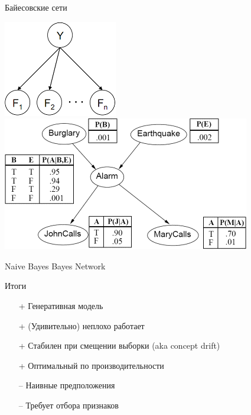 \documentclass[10pt,a4paper]{beamer}
\begin{document}
\begin{frame}{Байесовские сети}

\begin{center}
\includegraphics[scale=0.5]{images/naive.png}\quad
\includegraphics[scale=0.4]{images/network.png}

\vspace{1em}
Naive Bayes \hspace{10em} Bayes Network
\end{center}

\end{frame}


\begin{frame}{Итоги}

\begin{itemize}
\item[+] Генеративная модель
\item[+] (Удивительно) неплохо работает
\item[+] Стабилен при смещении выборки (aka concept drift)
\item[+] Оптимальный по производительности
\end{itemize}

\begin{itemize}
\item[--] Наивные предположения
\item[--] Требует отбора признаков
\end{itemize}

\end{frame}
\end{document}

